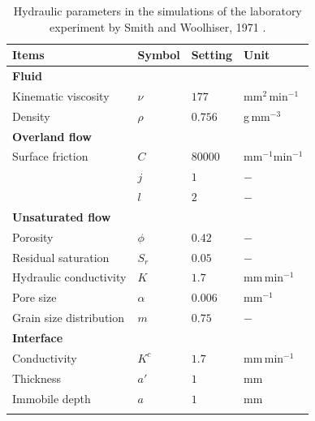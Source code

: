 \begin{table}[H]
 \centering
 \begin{tabular}{llll}
 \hline\hline\noalign{\smallskip}
 {\bf Items} & {\bf Symbol} & {\bf Setting} & {\bf Unit} \\ \hline \noalign{\smallskip}
 {\bf Fluid} & & & \\
 Kinematic viscosity            & $\nu$ & $177$ & mm$^2\,$min$^{-1}$  \\
 Density            & $\rho$ & $0.756$ & g$\,$mm$^{-3}$ \\ \hline \noalign{\smallskip}
{\bf Overland flow} & & & \\
 Surface friction  & $C$ & $80000$ & mm$^{-1}$min$^{-1} $ \\
 & $j$ & $1$ & $-$ \\
 & $l$ & $2$ & $-$ \\ \hline \noalign{\smallskip}
 {\bf Unsaturated flow} & & & \\
 Porosity             & $\phi$ & $0.42$ & $-$ \\
 Residual saturation & $S_r$ & $0.05$    &  $-$ \\
 Hydraulic conductivity & $K$ &  $1.7$  & mm$\, $min$^{-1}$\\
 Pore size   & $\alpha$ & $0.006$   &  mm$^{-1}$ \\
 Grain size distribution & $m$ & $0.75$  &  $-$ \\ \hline \noalign{\smallskip}
 {\bf Interface} & & & \\
 Conductivity  & $K^c$ & $1.7$ & mm$\,$min$^{-1}$\\
Thickness  & $a'$ & $1$ & mm \\
Immobile depth  & $a$ & $1$ & mm \\
\noalign{\smallskip}\hline\hline
 \end{tabular}
\centering
 \caption{Hydraulic parameters in the simulations of the laboratory experiment by Smith and Woolhiser, 1971 \cite{Smith:71}.}
 \label{us:WoolhiserSetting}
\end{table}
%
%
